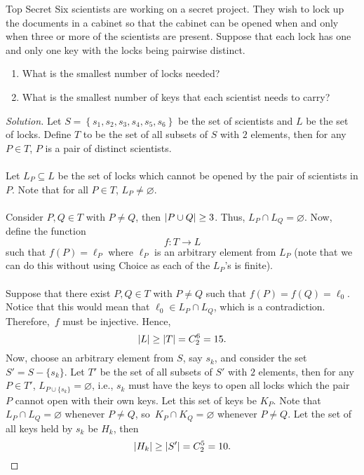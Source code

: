 \documentclass[math]{amznotes}
\theoremstyle{remark}
\newenvironment{solution}
    {\let\oldqedsymbol=\qedsymbol
    \renewcommand{\qedsymbol}{\ }
    \begin{proof}[Solution]
    }
    {\end{proof}
    \renewcommand{\qedsymbol}{\oldqedsymbol}
    }
\begin{document}
\begin{genbox}{Top Secret}
    Six scientists are working on a secret project. They wish to lock up the documents in a cabinet so that the cabinet can be opened when and only when three or more of the scientists are present. Suppose that each lock has one and only one key with the locks being pairwise distinct.
    \begin{enumerate}
        \item What is the smallest number of locks needed?
        \item What is the smallest number of keys that each scientist needs to carry?
    \end{enumerate}
    \tcblower   
    \begin{solution}
        Let $S = \left\{s_1, s_2, s_3, s_4, s_5, s_6\right\}$ be the set of scientists and $L$ be the set of locks. Define $T$ to be the set of all subsets of $S$ with $2$ elements, then for any $P \in T$, $P$ is a pair of distinct scientists.
        \\\\
        Let $L_P \subseteq L$ be the set of locks which cannot be opened by the pair of scientists in $P$. Note that for all $P \in T$, $L_P \neq \varnothing$. 
        \\\\
        Consider $P, Q \in T$ with $P \neq Q$, then ${\left\lvert {P \cup Q} \right\rvert} \geq 3$. Thus, $L_P \cap L_Q = \varnothing$. Now, define the function
        \begin{displaymath}
            f \colon T \to L
        \end{displaymath}
        such that $f(P) = \ell_P$ where $\ell_P$ is an arbitrary element from $L_P$ (note that we can do this without using Choice as each of the $L_P$'s is finite).
        \\\\
        Suppose that there exist $P, Q \in T$ with $P \neq Q$ such that $f(P) = f(Q) = \ell_0$. Notice that this would mean that $\ell_0 \in L_P \cap L_Q$, which is a contradiction. Therefore,~$f$ must be injective. Hence, 
        \begin{equation*}
            {\left\lvert {L} \right\rvert} \geq {\left\lvert {T} \right\rvert} = C^6_2 = 15.
        \end{equation*}
        Now, choose an arbitrary element from $S$, say $s_k$, and consider the set $S' = S - \{s_k\}$. Let $T'$ be the set of all subsets of $S'$ with $2$ elements, then for any $P \in T'$, $L_{P \cup \{s_k\}} = \varnothing$, i.e., $s_k$ must have the keys to open all locks which the pair $P$ cannot open with their own keys. Let this set of keys be $K_P$. Note that $L_P \cap L_Q = \varnothing$ whenever $P \neq Q$, so~$K_P \cap K_Q = \varnothing$ whenever $P \neq Q$. Let the set of all keys held by $s_k$ be $H_k$, then
        \begin{equation*}
            {\left\lvert {H_k} \right\rvert} \geq {\left\lvert {S'} \right\rvert} = C^5_2 = 10.
        \end{equation*}
    \end{solution}
\end{genbox}
\end{document}
